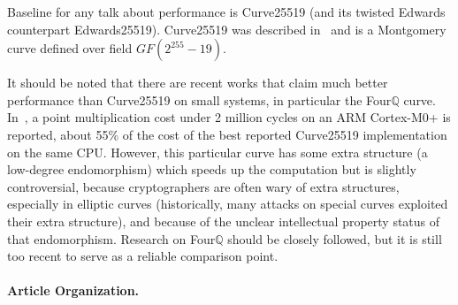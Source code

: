 \documentclass{llncs}
\newcommand{\GF}{GF}
\begin{document}
Baseline for any talk about performance is Curve25519 (and its
twisted Edwards counterpart Edwards25519). Curve25519 was described
in~\cite{Ber2006} and is a Montgomery curve defined over field
$\GF(2^{255}-19)$.

It should be noted that there are recent works that claim much better
performance than Curve25519 on small systems, in particular the
Four$\mathbb{Q}$ curve\cite{CraLon2015}. In~\cite{ZhaLinZhaZhoGao2018},
a point multiplication cost under 2 million cycles on an ARM Cortex-M0+
is reported, about 55\% of the cost of the best reported Curve25519
implementation on the same CPU. However, this particular curve has some
extra structure (a low-degree endomorphism) which speeds up the
computation but is slightly controversial, because cryptographers are
often wary of extra structures, especially in elliptic curves
(historically, many attacks on special curves exploited their extra
structure), and because of the unclear intellectual property status of
that endomorphism. Research on Four$\mathbb{Q}$ should be closely
followed, but it is still too recent to serve as a reliable comparison
point.

\paragraph{Article Organization.}
\end{document}
